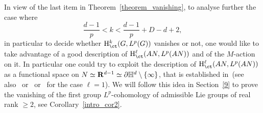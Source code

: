 \begin{rema}\label{remark_SL}
In view of the last item in Theorem~\ref{theorem_vanishing}, to analyse further the case where 
\[
\frac{d-1}{p} <k< \frac{d-1}{p} + D-d+2,
\]
in particular to decide whether ${\rm H}^k _{\ct} (G, L^p(G))$ vanishes or not, one would like to take advantage of a good description of ${\rm H}^\ell _{\ct} (AN, L^p(AN))$ and of the $M$-action on it. In particular one could try to exploit the description of ${\rm H}^\ell _{\ct} (AN, L^p(AN))$ as a functional space on $N \simeq {\bf R}^{d-1} \simeq \partial \mathbb H ^d \setminus \{\infty \}$, that is established in~\cite[Section~8.2]{Pa99}\linebreak(see also~\cite{Pa1} or~\cite{Rez} or~\cite{BP2} for the case $\ell =1$). We will follow this idea in Section~\ref{9} to prove the vanishing of the first group $L^p$-cohomology of admissible Lie groups of real rank $\geqslant 2$, see Corollary~\ref{intro_cor2}.
\end{rema}

